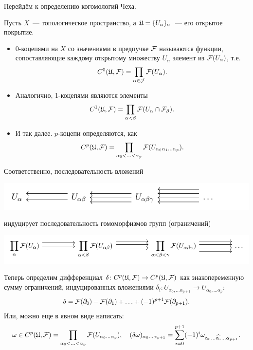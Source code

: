 	Перейдём к определению когомологий Чеха. 

	Пусть $X$~--- топологическое пространство, а $\mathfrak{U} = \{ U_{\alpha} \}_{\alpha}$~--- его открытое покрытие. 

	\begin{itemize}
		\item 0-коцепями на $X$ со значениями в предпучке $\mathcal{F}$ называются функции, сопоставляющие каждому открытому множеству $U_{\alpha}$ элемент из $\mathcal{F}(U_{\alpha})$, т.е. 
		\[
			C^{0}(\mathfrak{U}, \mathcal{F}) = \prod_{\alpha \in \mathcal{J}} \mathcal{F}(U_{\alpha}).
		\]
		\item Аналогично, 1-коцепями являются элементы 
		\[
			C^{1}(\mathfrak{U}, \mathcal{F}) = \prod_{\alpha < \beta} \mathcal{F}(U_{\alpha} \cap \mathcal{F}_{\beta}).
		\]
		\item И так далее. $p$-коцепи определяются, как 
		\[
			C^{p}(\mathfrak{U}, \mathcal{F}) = \prod_{\alpha_0 < \ldots < \alpha_p} \mathcal{F}(U_{\alpha_0 \alpha_1 \ldots \alpha_p}).
		\]
	\end{itemize}

	Соответственно, последовательность вложений 
	\begin{center}
		\includegraphics{lectures/7/pictures/cd_40.pdf}
	\end{center}
	индуцирует последовательность гомоморфизмов групп (ограничений)
	\begin{center}
		\includegraphics{lectures/7/pictures/cd_41.pdf}
	\end{center}

	Теперь определим дифференциал $\delta\colon C^{p}(\mathfrak{U}, \mathcal{F}) \to C^{p}(\mathfrak{U}, \mathcal{F})$ как знакопеременную сумму ограничений, индуцированных вложениями $\delta_i\colon U_{\alpha_0, \ldots \alpha_{p + 1}} \to U_{\alpha_0, \ldots \alpha_{p}}$: 
	\[
		\delta = \mathcal{F}(\partial_0) - \mathcal{F}(\partial_1) + \ldots + (-1)^{p + 1} \mathcal{F}(\partial_{p + 1}). 
	\]
	Или, можно еще в явном виде написать: 
	\[
		\omega \in C^{p}(\mathfrak{U}, \mathcal{F}) = \prod_{\alpha_0 < \ldots < \alpha_p} \mathcal{F}(U_{\alpha_0 \ldots \alpha_p}), \quad (\delta\omega)_{\alpha_0 \ldots \alpha_{p + 1}} = \sum_{i = 0}^{ p + 1 } (-1)^i \omega_{\alpha_0 \ldots \widehat{\alpha_i} \ldots \alpha_{p + 1}} . 
	\]

